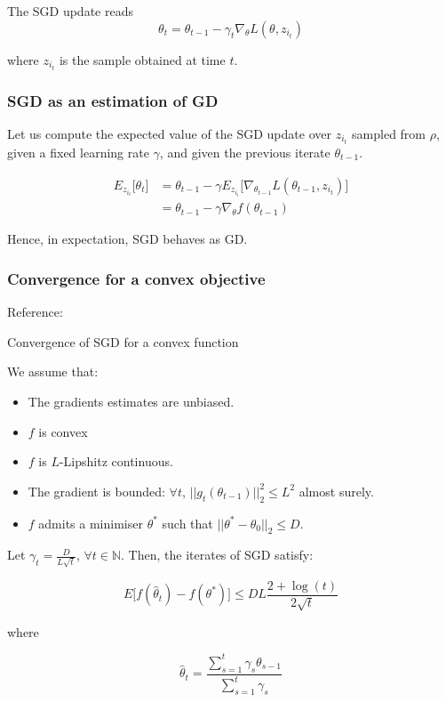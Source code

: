 \documentclass[
10pt, %
a4paper, %
oneside, %
headinclude,footinclude, %
BCOR5mm, %
]{scrartcl}
\begin{document}
The SGD update reads
\begin{equation*}
    \theta_t = \theta_{t-1}-\gamma_t \nabla_{\theta} L(\theta, z_{i_t})
\end{equation*}

where $z_{i_t}$ is the sample obtained at time $t$.

\subsubsection{\large\color{Periwinkle}SGD as an estimation of GD}

Let us compute the expected value of the SGD update over $z_{i_t}$ sampled from $\rho$, given a fixed learning rate $\gamma$, and given the previous iterate $ \theta_{t-1}$.

\begin{equation*}
    \begin{aligned}
	E_{z_{i_t}}\big[\theta_t\big] &= \theta_{t-1} - \gamma E_{z_{i_i}}\big[\nabla_{\theta_{t-1}} L(\theta_{t-1}, z_{i_t})\big]\\
	&= \theta_{t-1} - \gamma \nabla_{\theta} f(\theta_{t-1})
    \end{aligned}
\end{equation*}

Hence, in expectation, SGD behaves as GD.


\subsubsection{\large\color{Periwinkle}Convergence for a convex objective}

Reference: \cite{Bach2021} 

\begin{theorem}{Convergence of SGD for a convex function}
    \label{th:sgdconvex}

    We assume that:
    \begin{itemize}
	\item The gradients estimates are unbiased.
        \item $f$ is convex
	\item $f$ is $L$-Lipshitz continuous.
	\item The gradient is bounded: $\forall t$, $||g_t(\theta_{t-1})||_2^2\leq L^2$ almost surely.
	\item $f$ admits a minimiser $ \theta^*$ such that $||\theta^*-\theta_0||_2\leq D$.
    \end{itemize}

    Let $\gamma_t = \frac{D}{L \sqrt{t} } $, $\forall t\in \mathbb{N} $. Then, the iterates of SGD satisfy:

    \begin{equation}
	E\big[f( \hat{\theta}_t)-f(\theta^*)\big]\leq DL \frac{2+\log(t)}{2 \sqrt{t} }
    \end{equation}

    where 

    \begin{equation}
	\hat{\theta}_t = \frac{ \sum^{t}_{s=1} \gamma_s\theta_{s-1}}{ \sum^{t}_{s=1} \gamma_s} 
    \end{equation}

\end{theorem}
\end{document}
